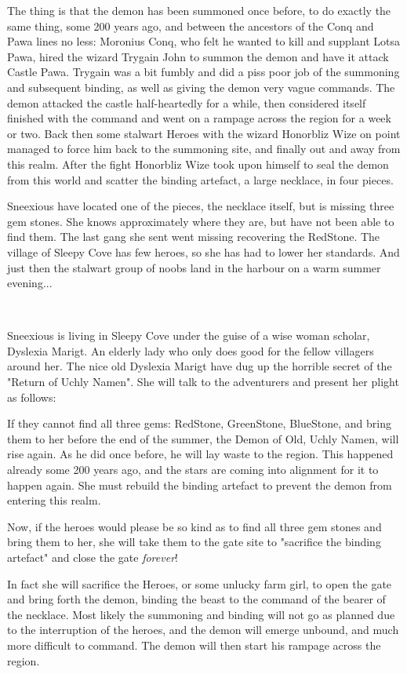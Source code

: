 The thing is that the demon has been summoned once before, to do exactly the same thing, some 200 years ago, and between the ancestors of the Conq and Pawa lines no less: Moronius Conq, who felt he wanted to kill and supplant Lotsa Pawa, hired the wizard Trygain John to summon the demon and have it attack Castle Pawa. Trygain was a bit fumbly and did a piss poor job of the summoning and subsequent binding, as well as giving the demon very vague commands. The demon attacked the castle half-heartedly for a while, then considered itself finished with the command and went on a rampage across the region for a week or two. Back then some stalwart Heroes with the wizard Honorbliz Wize on point managed to force him back to the summoning site, and finally out and away from this realm. After the fight Honorbliz Wize took upon himself to seal the demon from this world and scatter the binding artefact, a large necklace, in four pieces.

Sneexious have located one of the pieces, the necklace itself, but is missing three gem stones. She knows approximately where they are, but have not been able to find them. The last gang she sent went missing recovering the RedStone. The village of Sleepy Cove has few heroes, so she has had to lower her standards. And just then the stalwart group of noobs land in the harbour on a warm summer evening...

\

Sneexious is living in Sleepy Cove under the guise of a wise woman scholar, Dyslexia Marigt. An elderly lady who only does good for the fellow villagers around her. The nice old Dyslexia Marigt have dug up the horrible secret of the "Return of Uchly Namen". She will talk to the adventurers and present her plight as follows:

If they cannot find all three gems: RedStone, GreenStone, BlueStone, and bring them to her before the end of the summer, the Demon of Old, Uchly Namen, will rise again. As he did once before, he will lay waste to the region. This happened already some 200 years ago, and the stars are coming into alignment for it to happen again. She must rebuild the binding artefact to prevent the demon from entering this realm.

Now, if the heroes would please be so kind as to find all three gem stones and bring them to her, she will take them to the gate site to "sacrifice the binding artefact" and close the gate \emph{forever}!

In fact she will sacrifice the Heroes, or some unlucky farm girl, to open the gate and bring forth the demon, binding the beast to the command of the bearer of the necklace.
Most likely the summoning and binding will not go as planned due to the interruption of the heroes, and the demon will emerge unbound, and much more difficult to command. The demon will then start his rampage across the region.

